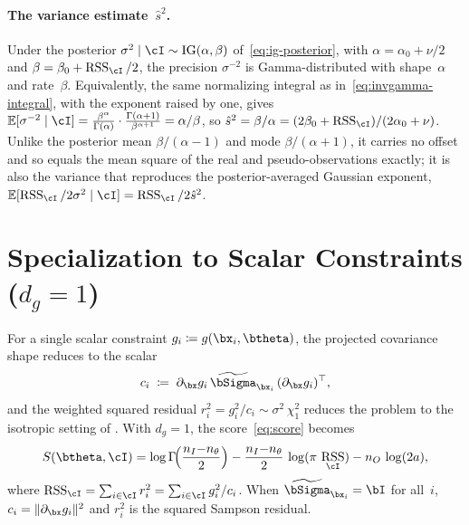 \documentclass{article}
\DeclareMathOperator{\RSS}{RSS}
\newcommand{\btSigma}{\widetilde{\bSigma}}  %
\newcommand{\IG}{\mathrm{IG}}
\begin{document}
\paragraph{The variance estimate~$\hat s^2$.}
Under the posterior $\sigma^2 \mid \cI \sim \IG(\alpha, \beta)$
of~\eqref{eq:ig-posterior}, with $\alpha = \alpha_0 + \nu/2$ and
$\beta = \beta_0 + \RSS_\cI/2$, the precision $\sigma^{-2}$ is
Gamma-distributed with shape~$\alpha$ and rate~$\beta$.  Equivalently,
the same normalizing integral as in~\eqref{eq:invgamma-integral}, with
the exponent raised by one, gives
$\mathbb{E}[\sigma^{-2} \mid \cI]
	= \frac{\beta^\alpha}{\Gamma(\alpha)}\cdot
	\frac{\Gamma(\alpha+1)}{\beta^{\alpha+1}} = \alpha/\beta$, so
$\hat s^2 = \beta/\alpha = (2\beta_0 + \RSS_\cI)/(2\alpha_0 + \nu)$.
Unlike the posterior mean $\beta/(\alpha-1)$ and mode
$\beta/(\alpha+1)$, it carries no offset and so equals the mean square
of the real and pseudo-observations exactly; it is also the variance
that reproduces the posterior-averaged Gaussian exponent,
$\mathbb{E}[\RSS_\cI/2\sigma^2 \mid \cI] = \RSS_\cI/2\hat s^2$.



\iffalse  %
	\section{Specialization to Scalar Constraints ($d_g = 1$)}
	\label{sec:supp-scalar}

	For a single scalar constraint
	$g_i \coloneqq g(\bx_i,\btheta)$,
	the projected covariance shape reduces to the scalar
	\begin{equation}
		c_i \;\coloneqq\;
		\pdv{g_i}!{\bx}\, \btSigma_{\bx_i}\,
		(\pdv{g_i}!{\bx})^\top,
		\label{eq:proj-var}
	\end{equation}
	and the weighted squared residual
	$r_i^2 = g_i^2/c_i \sim \sigma^2\,\chi^2_1$
	reduces the problem to the isotropic setting of
	.
	With $d_g = 1$, the score~\eqref{eq:score} becomes
	\begin{equation}
		S(\btheta, \cI)
		= \log\Gamma\!\Bigl(\frac{n_I{-}n_\theta}{2}\Bigr)
		- \frac{n_I{-}n_\theta}{2}\,\log(\pi\,\RSS_\cI)
		- n_O\, \log(2a),
		\label{eq:weighted-score}
	\end{equation}
	where $\RSS_\cI = \sum_{i\in\cI} r_i^2 = \sum_{i\in\cI} g_i^2 / c_i$.
	When $\btSigma_{\bx_i} = \bI$ for all~$i$,
	$c_i = \|\pdv{g_i}!{\bx}\|^2$ and $r_i^2$ is the squared
	Sampson residual.
\end{document}
